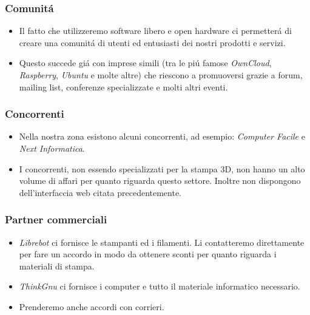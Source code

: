 \documentclass{beamer}
\begin{document}
    \begin{frame}
        \frametitle{Comunit\'a}
            \begin{itemize}
                \item Il fatto che utilizzeremo software libero e open hardware 
ci permetter\'a di creare una comunit\'a di utenti ed entusiasti dei nostri 
prodotti e servizi.
                \item Questo succede gi\'a con imprese simili (tra le pi\'u 
famose \emph{OwnCloud}, \emph{Raspberry}, \emph{Ubuntu} e molte altre) che 
riescono a promuoversi grazie a forum, mailing list, conferenze specializzate 
e molti altri eventi.
            \end{itemize}
    \end{frame}

    \begin{frame}
        \frametitle{Concorrenti}
            \begin{itemize}
            \item Nella nostra zona esistono alcuni concorrenti, ad esempio: 
\emph{Computer Facile} e \emph{Next Informatica}.
            \item I concorrenti, non essendo specializzati per la stampa 3D, 
non hanno un alto volume di affari per quanto riguarda questo settore. Inoltre 
non dispongono dell'interfaccia web citata precedentemente.
            \end{itemize}
    \end{frame}

    \begin{frame}
        \frametitle{Partner commerciali}
            \begin{itemize}
                \item \emph{Librebot} ci fornisce le stampanti ed i filamenti. 
Li contatteremo direttamente per fare un accordo in modo da ottenere 
sconti per quanto riguarda i materiali di stampa.
                \item \emph{ThinkGnu} ci fornisce i computer e tutto il 
materiale informatico necessario.
                \item Prenderemo anche accordi con corrieri.
            \end{itemize}
    \end{frame}
\end{document}
